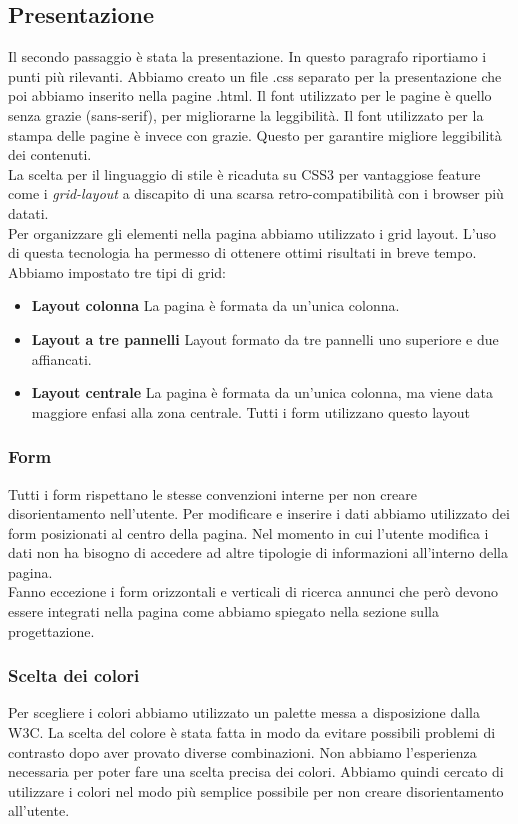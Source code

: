 \documentclass[1_relazione.tex]{subfiles}
\begin{document}
\subsection{Presentazione}
Il secondo passaggio \`{e} stata la presentazione. In questo paragrafo riportiamo i punti pi\`{u} rilevanti. Abbiamo creato un file .css separato per la presentazione che poi abbiamo inserito nella pagine .html. Il font utilizzato per le pagine \`{e} quello senza grazie (sans-serif), per migliorarne la leggibilit\`{a}. Il font utilizzato per la stampa delle pagine \`{e} invece con grazie. Questo per garantire migliore leggibilit\`{a} dei contenuti.  \\
La scelta per il linguaggio di stile è ricaduta su CSS3 per vantaggiose feature come i \textit{grid-layout} a discapito di una scarsa retro-compatibilità con i browser più datati.\\
Per organizzare gli elementi nella pagina abbiamo utilizzato i grid layout. L'uso di questa tecnologia ha permesso di ottenere ottimi risultati in breve tempo. Abbiamo impostato tre tipi di grid:
\begin{itemize}
\item \textbf{Layout colonna} La pagina è formata da un'unica colonna.
\item \textbf{Layout a tre pannelli} Layout formato da tre pannelli uno superiore e due affiancati.
\item \textbf{Layout centrale} La pagina è formata da un'unica colonna, ma viene data maggiore enfasi alla zona centrale. Tutti i form utilizzano questo layout
\end{itemize}

\subsubsection{Form}
Tutti i form rispettano le stesse convenzioni interne per non creare disorientamento nell'utente. Per modificare e inserire i dati abbiamo utilizzato dei form posizionati al centro della pagina. Nel momento in cui l'utente modifica i dati non ha bisogno di accedere ad altre tipologie di informazioni all'interno della pagina.\\ Fanno eccezione i form orizzontali e verticali di ricerca annunci che per\`{o} devono essere integrati nella pagina come abbiamo spiegato nella sezione sulla progettazione.

\subsubsection{Scelta dei colori}
Per scegliere i colori abbiamo utilizzato un palette messa a disposizione dalla W3C. La scelta del colore \`{e} stata fatta in modo da evitare possibili problemi di contrasto dopo aver provato diverse combinazioni. Non abbiamo l'esperienza necessaria per poter fare una scelta precisa dei colori. Abbiamo quindi cercato di utilizzare i colori nel modo pi\`{u} semplice possibile per non creare disorientamento all'utente.
\end{document}
